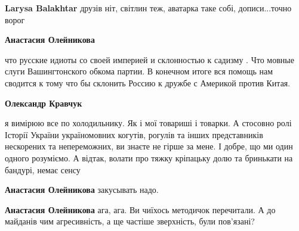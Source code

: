 \begin{itemize}
\begin{itemize}
\textbf{Larysa Balakhtar} друзів ніт, світлин теж, аватарка таке собі, дописи...точно ворог

 
\textbf{Анастасия Олейникова} 

что русские идиоты со своей империей и склонностью к садизму . Что мовные слуги
Вашингтонского обкома партии. В конечном итоге вся помощь нам сводится к тому
что бы склонить Россию к дружбе с Америкой против Китая.


 
\textbf{Олександр Кравчук} 

я вимірюю все по холодильнику. Як і мої товариші і товарки. А стосовно ролі
Історії України україномовних когутів, рогулів та інших представників
нескорених та непереможних, ви знаєте не гірше за мене. І добре, що ми один
одного розуміємо. А відтак, волати про тяжку кріпацьку долю та бринькати на
бандурі, немає сенсу \Smiley[1.0][yellow]

 
\textbf{Анастасия Олейникова} закусывать надо.

 
\textbf{Анастасия Олейникова} ага, ага. Ви чиїхось методичок перечитали. А до майданів чим агресивність, а ще частіше зверхність, були пов'язані?

 

\end{itemize}
\end{itemize}
